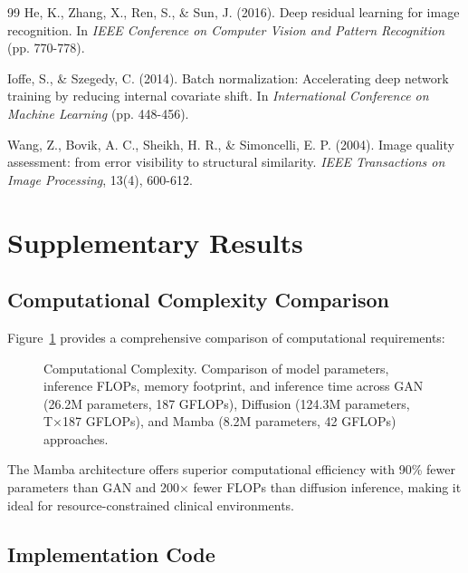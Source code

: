 \documentclass[10pt,conference,letterpaper]{IEEEtran}
\begin{document}
\begin{itemize}
\begin{thebibliography}{99}
He, K., Zhang, X., Ren, S., \& Sun, J. (2016).
\newblock Deep residual learning for image recognition.
\newblock In \textit{IEEE Conference on Computer Vision and Pattern Recognition} (pp. 770-778).

Ioffe, S., \& Szegedy, C. (2014).
\newblock Batch normalization: Accelerating deep network training by reducing internal covariate shift.
\newblock In \textit{International Conference on Machine Learning} (pp. 448-456).

Wang, Z., Bovik, A. C., Sheikh, H. R., \& Simoncelli, E. P. (2004).
\newblock Image quality assessment: from error visibility to structural similarity.
\newblock \textit{IEEE Transactions on Image Processing}, 13(4), 600-612.

\end{thebibliography}

\appendix

\section{Supplementary Results}
\label{app:supplementary}

\subsection{Computational Complexity Comparison}

Figure~\ref{fig:computational} provides a comprehensive comparison of computational requirements:

\begin{figure}[H]
  \centering
  \fbox{\rule{0pt}{3cm}\rule{4.5cm}{0pt}}
  \caption{Computational Complexity. Comparison of model parameters, inference FLOPs, memory footprint, and inference time across GAN (26.2M parameters, 187 GFLOPs), Diffusion (124.3M parameters, T×187 GFLOPs), and Mamba (8.2M parameters, 42 GFLOPs) approaches.}
  \label{fig:computational}
\end{figure}

The Mamba architecture offers superior computational efficiency with 90\% fewer parameters than GAN and 200× fewer FLOPs than diffusion inference, making it ideal for resource-constrained clinical environments.

\subsection{Implementation Code}
\label{app:code}


\end{itemize}
\end{document}
